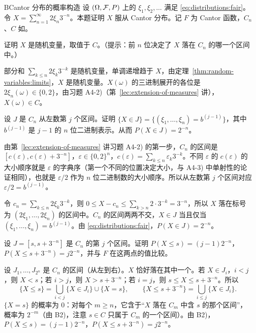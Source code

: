 \begin{probleme}{B}{Cantor 分布的概率构造}
设 $(\Omega,\mathcal{F},P)$ 上的 $\xi_1,\xi_2,\dots$ 满足 \eqref{eq:distributions:fair}。令 $X=\sum_{n=1}^\infty2\xi_n3^{-n}$。本题证明 $X$ 服从 Cantor 分布。记 $F$ 为 Cantor 函数，$C_n$、$C$ 如。
\begin{questions}
\item 证明 $X$ 是随机变量，取值于 $C$。（提示：前 $n$ 位决定了 $X$ 落在 $C_n$ 的哪一个区间中。）
\begin{solution}
部分和 $\sum_{k\leqslant n}2\xi_k3^{-k}$ 是随机变量，单调递增趋于 $X$，由定理~\ref{thm:random-variables:limits}，$X$ 是随机变量。$X(\omega)$ 的三进制展开的各位是 $2\xi_n(\omega)\in\{0,2\}$，由习题 A4-2)（第~\ref{lec:extension-of-measures} 讲），$X(\omega)\in C$。
\end{solution}
\item 设 $J$ 是 $C_n$ 从左数第 $j$ 个区间。证明 $\{X\in J\}=\{(\xi_1,\dots,\xi_n)=b^{(j-1)}\}$，其中 $b^{(j-1)}$ 是 $j-1$ 的 $n$ 位二进制表示。从而 $P(X\in J)=2^{-n}$。
\begin{solution}
由第~\ref{lec:extension-of-measures} 讲习题 A4-2) 的第一步，$C_n$ 的区间是 $[c(\varepsilon),c(\varepsilon)+3^{-n}]$，$\varepsilon\in\{0,2\}^n$，$c(\varepsilon)=\sum_{k\leqslant n}\varepsilon_k3^{-k}$。不同 $\varepsilon$ 的 $c(\varepsilon)$ 的大小顺序就是 $\varepsilon$ 的字典序（第一个不同的位置决定大小，与 A4-3) 中单射性的论证相同），也就是 $\varepsilon/2$ 作为 $n$ 位二进制数的大小顺序。所以从左数第 $j$ 个区间对应 $\varepsilon/2=b^{(j-1)}$。

令 $c_n=\sum_{k\leqslant n}2\xi_k3^{-k}$，则 $0\leqslant X-c_n\leqslant\sum_{k>n}2\cdot3^{-k}=3^{-n}$，所以 $X$ 落在标号为 $(2\xi_1,\dots,2\xi_n)$ 的区间中。$C_n$ 的区间两两不交，$X\in J$ 当且仅当 $(\xi_1,\dots,\xi_n)=b^{(j-1)}$。由 \eqref{eq:distributions:fair}，$P(X\in J)=2^{-n}$。
\end{solution}
\item 设 $J=[s,s+3^{-n}]$ 是 $C_n$ 的第 $j$ 个区间。证明 $P(X\leqslant s)=(j-1)2^{-n}$，$P(X\leqslant s+3^{-n})=j2^{-n}$，并与 $F$ 在这两点的值比较。
\begin{solution}
设 $J_1,\dots,J_{2^n}$ 是 $C_n$ 的区间（从左到右）。$X$ 恰好落在其中一个。若 $X\in J_i$，$i<j$，则 $X<s$；若 $i>j$，则 $X>s+3^{-n}$；若 $i=j$，则 $s\leqslant X\leqslant s+3^{-n}$。所以
\[
\{X\leqslant s\}=\bigcup_{i<j}\{X\in J_i\}\cup\{X=s\},\qquad\{X\leqslant s+3^{-n}\}=\bigcup_{i\leqslant j}\{X\in J_i\}.
\]
$\{X=s\}$ 的概率为 $0$：对每个 $m\geqslant n$，它含于“$X$ 落在 $C_m$ 中含 $s$ 的那个区间”，概率为 $2^{-m}$（由 B2)，注意 $s\in C$ 只属于 $C_m$ 的一个区间）。由 B2)，$P(X\leqslant s)=(j-1)2^{-n}$，$P(X\leqslant s+3^{-n})=j2^{-n}$。


\end{solution}
\end{questions}
\end{probleme}
